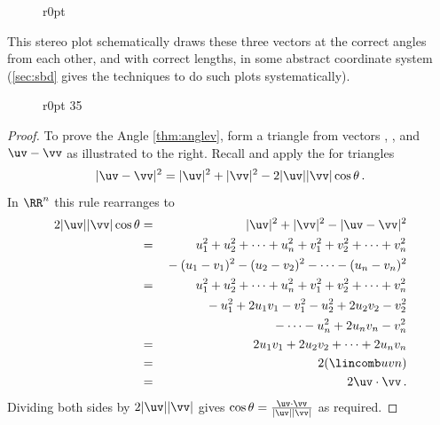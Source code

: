 \begin{example}
\begin{solution}
\begin{itemize}
\end{itemize}
\begin{figure}[7]r{0pt}
 {
}
\end{figure}

This stereo plot schematically draws these three vectors at the correct angles from each other, and with correct lengths, in some abstract coordinate system (\cref{sec:sbd} gives the techniques to do such plots systematically).\aqed
\par
\end{solution}
\end{example}


\begin{figure}r{0pt}
\def\vecopsHook{\node[above] at (axis cs:0,0) {$\qquad\theta$};}
35\end{figure}
\begin{proof} 
To prove the Angle \cref{thm:anglev}, form a triangle from vectors \uv, \vv, and \(\uv-\vv\) as illustrated to the right.
Recall and apply the  for triangles
\begin{equation*}
|\uv-\vv|^2=|\uv|^2+|\vv|^2-2|\uv||\vv|\cos\theta\,.
\end{equation*}
In \(\RR^n\) this rule rearranges to
\begin{eqnarray*}
2|\uv||\vv|\cos\theta
&=&|\uv|^2+|\vv|^2-|\uv-\vv|^2
\\&=&u_1^2+u_2^2+\cdots+u_n^2
+v_1^2+v_2^2+\cdots+v_n^2
\\&&{}
-(u_1-v_1)^2-(u_2-v_2)^2-\cdots-(u_n-v_n)^2
\\&=&u_1^2+u_2^2+\cdots+u_n^2
+v_1^2+v_2^2+\cdots+v_n^2
\\&&{}
-u_1^2+2u_1v_1-v_1^2-u_2^2+2u_2v_2-v_2^2
\\&&{}
-\cdots-u_n^2+2u_nv_n-v_n^2
\\&=&2u_1v_1+2u_2v_2+\cdots+2u_nv_n
\\&=&2(\lincomb uvn)
\\&=&2\uv\cdot\vv\,.
\end{eqnarray*}
Dividing both sides by \(2|\uv||\vv|\) gives \(\cos\theta=\frac{\uv\cdot\vv}{|\uv||\vv|}\) as required.
\aqed

\end{proof}



